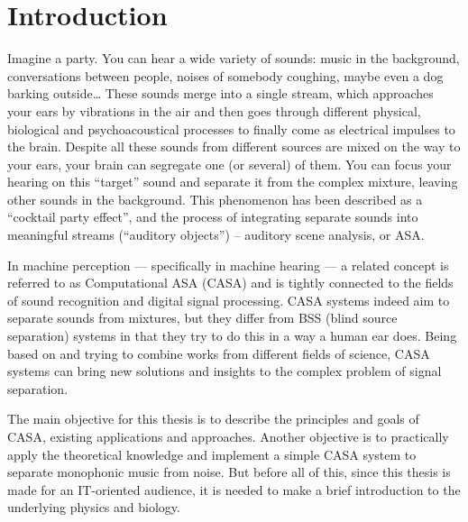 \chapter{Introduction}

Imagine a party. You can hear a wide variety of sounds: music in the background, conversations between people, noises of somebody coughing, maybe even a dog barking outside… These sounds merge into a single stream, which approaches your ears by vibrations in the air and then goes through different physical, biological and psychoacoustical processes to finally come as electrical impulses to the brain. Despite all these sounds from different sources are mixed on the way to your ears, your brain can segregate one (or several) of them. You can focus your hearing on this “target” sound and separate it from the complex mixture, leaving other sounds in the background. This phenomenon has been described as a “cocktail party effect”, and the process of integrating separate sounds into meaningful streams (“auditory objects”) -- auditory scene analysis, or ASA.

In machine perception --- specifically in machine hearing --- a related concept is referred to as Computational ASA (CASA) and is tightly connected to the fields of sound recognition and digital signal processing. CASA systems indeed aim to separate sounds from mixtures, but they differ from BSS (blind source separation) systems in that they try to do this in a way a human ear does. Being based on and trying to combine works from different fields of science, CASA systems can bring new solutions and insights to the complex problem of signal separation.

The main objective for this thesis is to describe the principles and goals of CASA, existing applications and approaches. Another objective is to practically apply the theoretical knowledge and implement a simple CASA system to separate monophonic music from noise. But before all of this, since this thesis is made for an IT-oriented audience, it is needed to make a brief introduction to the underlying physics and biology.

